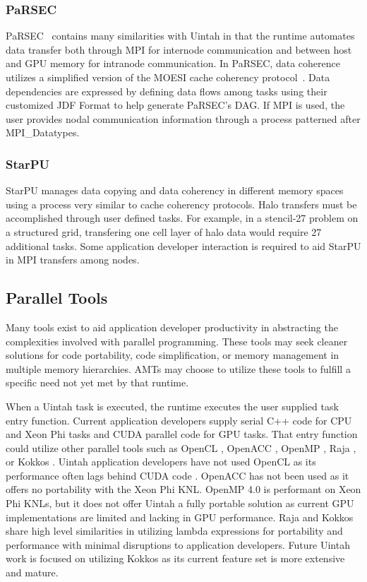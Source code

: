 \documentclass[12pt]{article}
\begin{document}
\subsubsection{PaRSEC}
\label{ch:PaRSEC}
PaRSEC~\cite{parsec2012} contains many similarities with Uintah in that the runtime automates data transfer both through MPI for internode communication and between host and GPU memory for intranode communication.  In PaRSEC, data coherence utilizes a simplified version of the MOESI cache coherency protocol~\cite{parsec-coherency}.  Data dependencies are expressed by defining data flows among tasks using their customized JDF Format to help generate PaRSEC's DAG.  If MPI is used, the user provides nodal communication information through a process patterned after MPI\_Datatypes. 

\subsubsection{StarPU}
\label{ch:StarPU}
StarPU \cite{starpu} manages data copying and data coherency in different memory spaces using a process very similar to cache coherency protocols.  Halo transfers must be accomplished through user defined tasks.  For example, in a stencil-27 problem on a structured grid, transfering one cell layer of halo data would require 27 additional tasks.  Some application developer interaction is required to aid StarPU in MPI transfers among nodes.  

\subsection{Parallel Tools}
\label{ch:parallel_tools}

Many tools exist to aid application developer productivity in abstracting the complexities involved with parallel programming.  These tools may seek cleaner solutions for code portability, code simplification, or memory management in multiple memory hierarchies.  AMTs may choose to utilize these tools to fulfill a specific need not yet met by that runtime. 

When a Uintah task is executed, the runtime executes the user supplied task entry function.  Current application developers supply serial C++ code for CPU and Xeon Phi tasks and CUDA parallel code for GPU tasks.  That entry function could utilize other parallel tools such as OpenCL \cite{opencl-specification}, OpenACC \cite{openacc-25}, OpenMP \cite{openmp}, Raja \cite{raja}, or Kokkos \cite{kokkos2012}.  Uintah application developers have not used OpenCL as its performance often lags behind CUDA code \cite{Sorman2016}.  OpenACC has not been used as it offers no portability with the Xeon Phi KNL.  OpenMP 4.0 is performant on Xeon Phi KNLs, but it does not offer Uintah a fully portable solution as current GPU implementations are limited and lacking in GPU performance\cite{Martineau2016}.  Raja and Kokkos share high level similarities in utilizing lambda expressions for portability and performance with minimal disruptions to application developers.  Future Uintah work is focused on utilizing Kokkos as its current feature set is more extensive and mature.  
\end{document}
